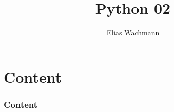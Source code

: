 \documentclass{beamer}
\title[]
{Python 02}
\author[E.~Wachmann]{\scriptsize Elias Wachmann
}
\date{\the\year}
\institute[Institute of Theoretical and Computational Physics]
{
}
\begin{document}
\titleframe


\section*{Content}

\begin{frame}
\frametitle{Content}
  \tableofcontents
\end{frame}
\end{document}
